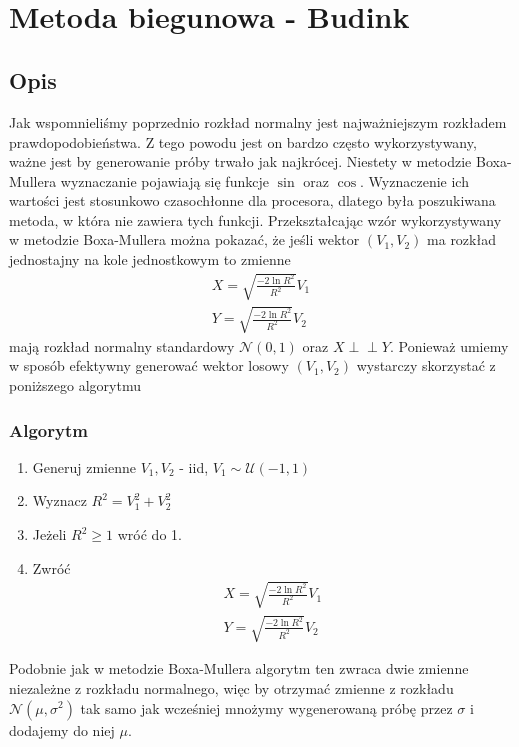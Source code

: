 \documentclass[12pt]{mwrep}
\newcommand{\indep}{\perp \!\!\! \perp}
\begin{document}
	
	
	\section{Metoda biegunowa\textsuperscript{\cite{polar}} - Budink}
	\subsection{Opis}
	\noindent Jak wspomnieliśmy poprzednio rozkład normalny jest najważniejszym rozkładem prawdopodobieństwa. Z tego powodu jest on bardzo często wykorzystywany, ważne jest by generowanie próby trwało jak najkrócej. Niestety w metodzie Boxa-M{u}llera wyznaczanie pojawiają się funkcje $\sin$ oraz $\cos$. Wyznaczenie ich wartości jest stosunkowo czasochłonne dla procesora, dlatego była poszukiwana metoda, w która nie zawiera tych funkcji. Przekształcając wzór wykorzystywany w metodzie Boxa-Mullera można pokazać, że jeśli wektor $(V_1, V_2)$ ma rozkład jednostajny na kole jednostkowym to zmienne
	\begin{equation}
		\begin{split}
			X=\sqrt{\frac{-2\ln R^2}{R^2}}V_1\\
			Y=\sqrt{\frac{-2\ln R^2}{R^2}}V_2
		\end{split}
	\end{equation}
	mają rozkład normalny standardowy $\mathcal{N}(0,1)$ oraz $X \indep Y$. Ponieważ umiemy w sposób efektywny generować wektor losowy $(V_1, V_2)$ wystarczy skorzystać z poniższego algorytmu
	\subsubsection{Algorytm}
	\begin{enumerate}[leftmargin=10mm]
		\item Generuj zmienne $V_1, V_2$ - iid, $V_1\sim\mathcal{U}(-1,1)$
		\item Wyznacz $R^2=V_1^2+V_2^2$
		\item Jeżeli $R^2\ge 1$ wróć do 1.
		\item Zwróć
		\begin{equation}
			\begin{split}
				X=\sqrt{\frac{-2\ln R^2}{R^2}}V_1\\
				Y=\sqrt{\frac{-2\ln R^2}{R^2}}V_2
			\end{split}
		\end{equation}
	\end{enumerate}
	Podobnie jak w metodzie Boxa-M{u}llera algorytm ten zwraca dwie zmienne niezależne z rozkładu normalnego, więc by otrzymać zmienne z rozkładu $\mathcal{N}(\mu,\sigma^2)$ tak samo jak wcześniej mnożymy wygenerowaną próbę przez $\sigma$ i dodajemy do niej $\mu$.
	
\end{document}
